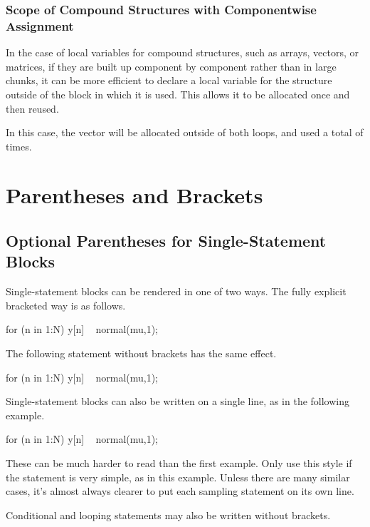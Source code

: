 \subsubsection{Scope of Compound Structures with Componentwise Assignment}

In the case of local variables for compound structures, such as
arrays, vectors, or matrices, if they are built up component by
component rather than in large chunks, it can be more efficient to
declare a local variable for the structure outside of the block
in which it is used.  This allows it to be allocated once and then
reused.
%
\begin{stancode}
model {
  vector[K] mu;
  for (n in 1:N) {
    for (k in 1:K) 
      mu[k] = ...;
    y[n] ~ multi_normal(mu,Sigma);
}
\end{stancode}
%
In this case, the vector  will be allocated
outside of both loops, and used a total of  times.

\section{Parentheses and Brackets}

\subsection{Optional Parentheses for Single-Statement Blocks}

Single-statement blocks can be rendered in one of two ways.  The fully
explicit bracketed way is as follows.
%
\begin{stancode}
for (n in 1:N) {
  y[n] ~ normal(mu,1);
}
\end{stancode}
%
The following statement without brackets has the same effect.
%
\begin{stancode}
for (n in 1:N)
  y[n] ~ normal(mu,1);
\end{stancode}
%  
Single-statement blocks can also be written on a single line, as
in the following example.
%
\begin{stancode}
for (n in 1:N) y[n] ~ normal(mu,1);
\end{stancode}
%
These can be much harder to read than the first example. Only use this
style if the statement is very simple, as in this example.  Unless
there are many similar cases, it's almost always clearer to put
each sampling statement on its own line.

Conditional and looping statements may also be written without brackets.

